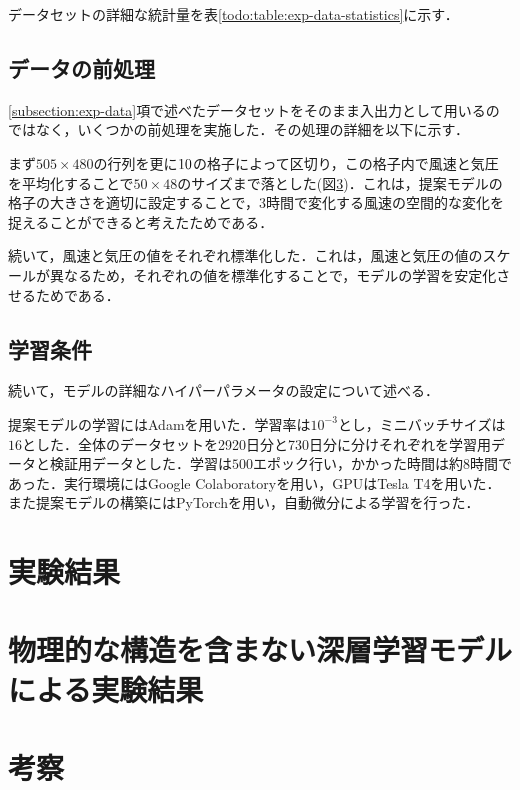 データセットの詳細な統計量を表\ref{todo:table:exp-data-statistics}に示す．

\subsection{データの前処理 \label{subsection:exp-data-preprocessing}}
\ref{subsection:exp-data}項で述べたデータセットをそのまま入出力として用いるのではなく，いくつかの前処理を実施した．その処理の詳細を以下に示す．

まず$505 \times 480$の行列を更に$10 \time 10$の格子によって区切り，この格子内で風速と気圧を平均化することで$50 \times 48$のサイズまで落とした(図\ref{})．これは，提案モデルの格子の大きさを適切に設定することで，3時間で変化する風速の空間的な変化を捉えることができると考えたためである．

続いて，風速と気圧の値をそれぞれ標準化した．これは，風速と気圧の値のスケールが異なるため，それぞれの値を標準化することで，モデルの学習を安定化させるためである．

\subsection{学習条件 \label{subsection:exp-condition}}

続いて，モデルの詳細なハイパーパラメータの設定について述べる．

提案モデルの学習にはAdam\cite{Kingma2014AdamAM}を用いた．学習率は$10^{-3}$とし，ミニバッチサイズは$16$とした．全体のデータセットを2920日分と730日分に分けそれぞれを学習用データと検証用データとした．学習は$500$エポック行い，かかった時間は約8時間であった．実行環境にはGoogle Colaboratory\cite{GoogleColaboratory}を用い，GPUはTesla T4を用いた．また提案モデルの構築にはPyTorch\cite{NEURIPS2019-9015}を用い，自動微分による学習を行った．

\section{実験結果 \label{section:exp-results}}

\section{物理的な構造を含まない深層学習モデルによる実験結果 \label{section:exp-results-without-physicial-structure}}

\section{考察 \label{section:exp-discussion}}
